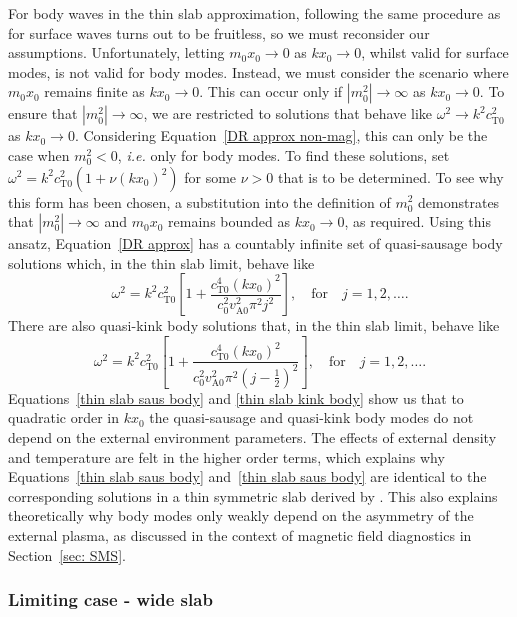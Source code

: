 \documentclass[12pt]{../style-files/ociamthesis}
\begin{document}
For body waves in the thin slab approximation, following the same procedure as for surface waves turns out to be fruitless, so we must reconsider our assumptions. Unfortunately, letting $m_0x_0 \to 0$ as $kx_0 \to 0$, whilst valid for surface modes, is not valid for body modes. Instead, we must consider the scenario where $m_0x_0$ remains finite as $kx_0 \to 0$. This can occur only if $|m_0^2| \to \infty$ as $kx_0 \to 0$.  To ensure that $|m_0^2| \to \infty$, we are restricted to solutions that behave like $\omega^2 \to k^2c_\textrm{T0}^2$ as $kx_0 \to 0$. Considering Equation~\eqref{DR approx non-mag}, this can only be the case when $m_0^2 < 0$, \textit{i.e.} only for body modes. To find these solutions, set $\omega^2 = k^2c_\textrm{T0}^2(1 + \nu(kx_0)^2)$ for some $\nu > 0$ that is to be determined. To see why this form has been chosen, a substitution into the definition of $m_0^2$ demonstrates that $|m_0^2| \to \infty$ and $m_0x_0$ remains bounded as $kx_0 \to 0$, as required. Using this ansatz, Equation~\eqref{DR approx} has a countably infinite set of quasi-sausage body solutions which, in the thin slab limit, behave like
\begin{equation}
\omega^2 = k^2c_\textrm{T0}^2\left[1 + \frac{c_\textrm{T0}^4(kx_0)^2}{c_0^2v_\textrm{A0}^2\pi^2j^2}\right], \quad \text{for} \quad j = 1, 2, \ldots. \label{thin slab saus body}
\end{equation}
There are also quasi-kink body solutions that, in the thin slab limit, behave like
\begin{equation}
\omega^2 = k^2c_\textrm{T0}^2\left[1 + \frac{c_\textrm{T0}^4(kx_0)^2}{c_0^2v_\textrm{A0}^2\pi^2(j - \frac{1}{2})^2}\right], \quad \text{for} \quad j = 1, 2, \ldots. \label{thin slab kink body}
\end{equation}
Equations~\eqref{thin slab saus body} and \eqref{thin slab kink body} show us that to quadratic order in $kx_0$ the quasi-sausage and quasi-kink body modes do not depend on the external environment parameters. The effects of external density and temperature are felt in the higher order terms, which explains why Equations~\eqref{thin slab saus body} and~\eqref{thin slab saus body} are identical to the corresponding solutions in a thin symmetric slab derived by \citealt{rob81b}. This also explains theoretically why body modes only weakly depend on the asymmetry of the external plasma, as discussed in the context of magnetic field diagnostics in Section~\ref{sec: SMS}.


\subsubsection{Limiting case - wide slab} \label{sec: wide slab}
\end{document}
